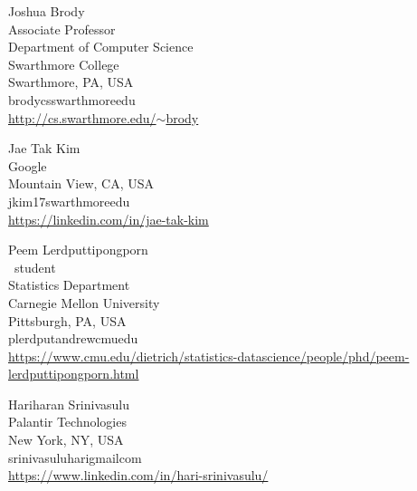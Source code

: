 \documentclass{toc}
\begin{document}

%
%
%
%


%
%
%
%
%
\begin{tocauthors}
\begin{tocinfo}[brody]
 Joshua Brody\\
 Associate Professor\\
 Department of Computer Science\\
 Swarthmore College\\
 Swarthmore, PA, USA\\
 brody\tocat{}cs\tocdot{}swarthmore\tocdot{}edu \\   %
 \href{http://cs.swarthmore.edu/~brody}{http://cs.swarthmore.edu/$\sim$brody}
\end{tocinfo}
\begin{tocinfo}[kim]           %
  Jae Tak Kim\\
  Google\\                    %
  Mountain View, CA, USA\\    %
  jkim17\tocat{}swarthmore\tocdot{}edu\\     %
 \href{https://linkedin.com/in/jae-tak-kim}{https://linkedin.com/in/jae-tak-kim}
\end{tocinfo}
\begin{tocinfo}[lerdputtipongporn]
  Peem Lerdputtipongporn\\
  \phd\ student\\
  Statistics Department\\
  Carnegie Mellon University\\
  Pittsburgh, PA, USA \\ 
  plerdput\tocat{}andrew\tocdot{}cmu\tocdot{}edu  \\ %
  \href{https://www.cmu.edu/dietrich/statistics-datascience/people/phd/peem-lerdputtipongporn.html}{https://www.cmu.edu/dietrich/statistics-datascience/\newline people/phd/peem-lerdputtipongporn.html}
\end{tocinfo}
\begin{tocinfo}[srinivasulu]   %
  Hariharan Srinivasulu\\
  Palantir Technologies \\      %
  New York, NY, USA \\          %
  srinivasulu\tocdot{}hari\tocat{}gmail\tocdot{}com \\ %
  \href{https://www.linkedin.com/in/hari-srinivasulu/}{https://www.linkedin.com/in/hari-srinivasulu/} 
\end{tocinfo}
\end{tocauthors}
\end{document}
